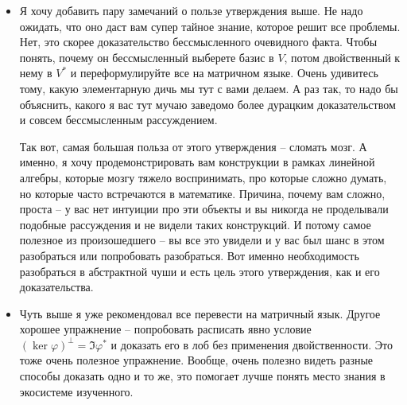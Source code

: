 \begin{itemize}
\item Я хочу добавить пару замечаний о пользе утверждения выше.
Не надо ожидать, что оно даст вам супер тайное знание, которое решит все проблемы.
Нет, это скорее доказательство бессмысленного очевидного факта.
Чтобы понять, почему он бессмысленный выберете базис в $V$, потом двойственный к нему в $V^*$ и переформулируйте все на матричном языке.
Очень удивитесь тому, какую элементарную дичь мы тут с вами делаем.
А раз так, то надо бы объяснить, какого я вас тут мучаю заведомо более дурацким доказательством и совсем бессмысленным рассуждением.

Так вот, самая большая польза от этого утверждения -- сломать мозг.
А именно, я хочу продемонстрировать вам конструкции в рамках линейной алгебры, которые мозгу тяжело воспринимать, про которые сложно думать, но которые часто встречаются в математике.
Причина, почему вам сложно, проста -- у вас нет интуиции про эти объекты и вы никогда не проделывали подобные рассуждения и не видели таких конструкций.
И потому самое полезное из произошедшего -- вы все это увидели и у вас был шанс в этом разобраться или попробовать разобраться.
Вот именно необходимость разобраться в абстрактной чуши и есть цель этого утверждения, как и его доказательства.

\item Чуть выше я уже рекомендовал все перевести на матричный язык.
Другое хорошее упражнение -- попробовать расписать явно условие $(\ker \varphi)^\bot = \Im \varphi^*$ и доказать его в лоб без применения двойственности.
Это тоже очень полезное упражнение.
Вообще, очень полезно видеть разные способы доказать одно и то же, это помогает лучше понять место знания в экосистеме изученного.
\end{itemize}